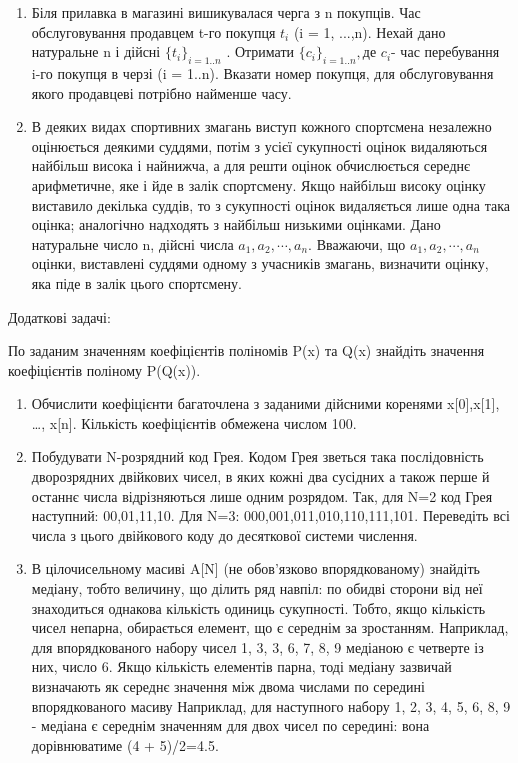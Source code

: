 \documentclass[]{article}
\makeatletter
\newcommand{\xslalph}[1]{\expandafter\@xslalph\csname c@#1\endcsname}
\newcommand{\@xslalph}[1]{%
    \ifcase#1\or а\or б\or в\or г\or д\or e\or є\or ж\or з\or i%
    \or й\or к\or л\or м\or н\or о\or п\or р\or с\or т%
    \or у\or ф\or х\or ц\or ч\or ш\or ю\or я\or аа\or бб\or вв%
    \else\@ctrerr\fi%
}
\makeatother
\begin{document}
\begin{enumerate}
\begin{enumerate}[label=\xslalph*)]
\begin{enumerate}
\begin{enumerate}[label=\xslalph*)]
\begin{enumerate}
\item
  Біля прилавка в магазині вишикувалася черга з n покупців. Час
  обслуговування продавцем t-го покупця \(t_{i}\) (i = 1, ...,n). Нехай
  дано натуральне n і дійсні \({\{ t_{i}\}}_{i = 1..n}\) . Отримати
  \({\{ c_{i}\}}_{i = 1..n},\)де \(c_{i}\)- час перебування i-го покупця
  в черзі (i = 1..n). Вказати номер покупця, для обслуговування якого
  продавцеві потрібно найменше часу.
\item
  В деяких видах спортивних змагань виступ кожного спортсмена незалежно
  оцінюється деякими суддями, потім з усієї сукупності оцінок
  видаляються найбільш висока і найнижча, а для решти оцінок
  обчислюється середнє арифметичне, яке і йде в залік спортсмену. Якщо
  найбільш високу оцінку виставило декілька суддів, то з сукупності
  оцінок видаляється лише одна така оцінка; аналогічно надходять з
  найбільш низькими оцінками. Дано натуральне число n, дійсні числа
  \(a_{1},a_{2},\cdots,a_{n}\). Вважаючи, що
  \(a_{1},a_{2},\cdots,a_{n}\)оцінки, виставлені суддями одному з
  учасників змагань, визначити оцінку, яка піде в залік цього
  спортсмену.
\end{enumerate}

Додаткові задачі:

По заданим значенням коефіцієнтів поліномів P(x) та Q(x) знайдіть
значення коефіцієнтів поліному P(Q(x)).

\begin{enumerate}
\def\labelenumi{\arabic{enumi})}
\setcounter{enumi}{12}
\item
  Обчислити коефіцієнти багаточлена з заданими дійсними коренями
  x{[}0{]},x{[}1{]}, \ldots{}, x{[}n{]}. Кількість коефіцієнтів обмежена
  числом 100.
\item
  Побудувати N-розрядний код Грея. Кодом Грея зветься така послідовність
  дворозрядних двійкових чисел, в яких кожні два сусідних а також перше
  й останнє числа відрізняються лише одним розрядом. Так, для N=2 код
  Грея наступний: 00,01,11,10. Для N=3: 000,001,011,010,110,111,101.
  Переведіть всі числа з цього двійкового коду до десяткової системи
  числення.
\item
  В цілочисельному масиві A{[}N{]} (не обов'язково впорядкованому)
  знайдіть медіану, тобто величину, що ділить ряд навпіл: по обидві
  сторони від неї знаходиться однакова кількість одиниць сукупності.
  Тобто, якщо кількість чисел непарна, обирається елемент, що є середнім
  за зростанням. Наприклад, для впорядкованого набору чисел 1, 3, 3, 6,
  7, 8, 9 медіаною є четверте із них, число 6. Якщо кількість елементів
  парна, тоді медіану зазвичай визначають як середнє значення між двома
  числами по середині впорядкованого масиву Наприклад, для наступного
  набору 1, 2, 3, 4, 5, 6, 8, 9 - медіана є середнім значенням для двох
  чисел по середині: вона дорівнюватиме (4 + 5)/2=4.5.
\end{enumerate}


\end{enumerate}
\end{enumerate}
\end{enumerate}
\end{enumerate}
\end{document}
